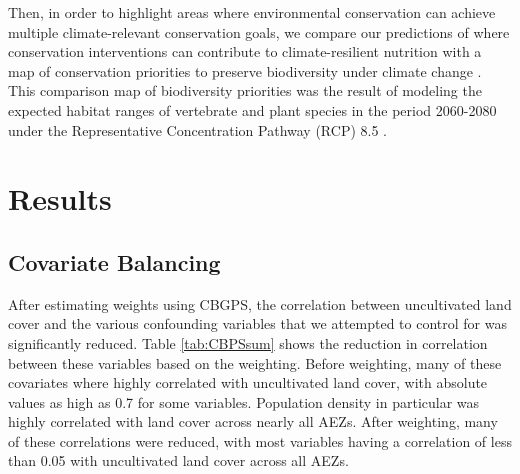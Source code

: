 \documentclass{article}
\begin{document}
Then, in order to highlight areas where environmental conservation can achieve multiple climate-relevant conservation goals, we compare our predictions of where conservation interventions can contribute to climate-resilient nutrition with a map of conservation priorities to preserve biodiversity under climate change \cite{hannah2020}.  This comparison map of biodiversity priorities was the result of modeling the expected habitat ranges of vertebrate and plant species in the period 2060-2080 under the Representative Concentration Pathway (RCP) 8.5 \cite{hannah2020}.

\section{Results}
\subsection{Covariate Balancing}
After estimating weights using CBGPS, the correlation between uncultivated land cover and the various confounding variables that we attempted to control for was significantly reduced.  Table \ref{tab:CBPSsum} shows the reduction in correlation between these variables based on the weighting.  Before weighting, many of these covariates where highly correlated with uncultivated land cover, with absolute values as high as 0.7 for some variables.  Population density in particular was highly correlated with land cover across nearly all AEZs.  After weighting, many of these correlations were reduced, with most variables having a correlation of less than 0.05 with uncultivated land cover across all AEZs.
\end{document}
